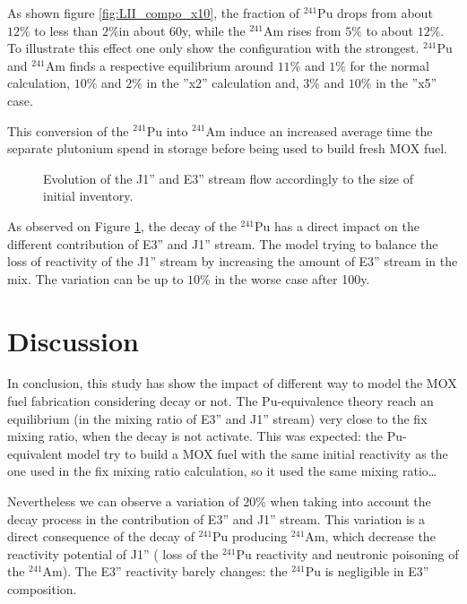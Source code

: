 \documentclass[10pt]{article}
\begin{document}
As shown figure \ref{fig:LII_compo_x10}, the fraction of $^{241}$Pu drops from
about $12\%$ to less than $2\%$in about 60y, while the $^{241}$Am rises from
$5\%$ to about $12\%$. To illustrate this effect one only show the configuration
with the strongest. $^{241}$Pu and $^{241}$Am finds a respective equilibrium
around $11\%$ and $1\%$ for the normal calculation, $10\%$ and $2\%$ in the
''x2'' calculation and, $3\%$ and $10\%$ in the ''x5'' case. 

This conversion of the $^{241}$Pu into $^{241}$Am induce an increased average
time the separate plutonium spend in storage before being used to build fresh
MOX fuel.

\begin{figure}[h!]
  \centering
  

  \caption{ Evolution of the J1'' and E3'' stream flow accordingly to the size
    of initial inventory. \label{fig:LII} } 
  \end{figure}

As observed on Figure \ref{fig:LII}, the decay of the $^{241}$Pu has a direct
impact on the different contribution of E3'' and J1'' stream. The model trying
to balance the loss of reactivity of the J1'' stream by increasing the amount of
E3'' stream in the mix. The variation can be up to $10\%$ in the worse case
after 100y.

\section{Discussion}

In conclusion, this study has show the impact of different way to model
the MOX fuel fabrication considering decay or not.
The Pu-equivalence theory reach an equilibrium (in the mixing ratio of E3'' and
J1'' stream) very close to the fix mixing ratio, when the decay is not activate.
This was expected: the Pu-equivalent model try to build a MOX fuel with the same
initial reactivity as the one used in the fix mixing ratio calculation, so it
used the same mixing ratio\dots  

Nevertheless we can observe a variation of $20\%$ when taking into account the
decay process in the contribution of E3'' and J1'' stream. This variation is a
direct consequence of the decay of $^{241}$Pu producing $^{241}$Am, which
decrease the reactivity potential of J1'' ( loss of the $^{241}$Pu reactivity
and neutronic poisoning of the $^{241}$Am). The E3'' reactivity barely changes:
the $^{241}$Pu is negligible in E3'' composition.
\end{document}
